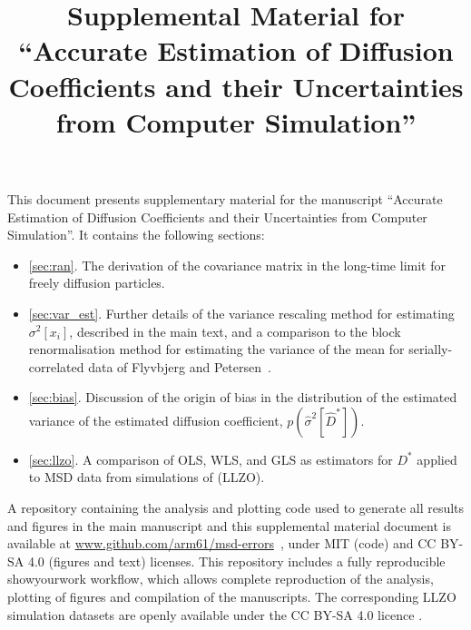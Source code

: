 \documentclass[reprint,superscriptaddress,nobibnotes,amsmath,amssymb,aps,prx,hidelinks]{revtex4-2}
\makeatletter
\newcommand{\papertitle}{Accurate Estimation of Diffusion Coefficients and their Uncertainties from Computer Simulation}
\newcommand{\oMSDi}{\ensuremath{x_i}}
\newcommand{\prob}[1]{\ensuremath{p(#1)}}
\newcommand{\code}[1]{#1}
\newcommand{\Dest}{\ensuremath{\widehat{D}^*}}
\newcommand{\D}{\ensuremath{D^*}}
\newcommand{\var}[1]{\ensuremath{\sigma^2[#1]}}
\newcommand{\varest}[1]{\ensuremath{\widehat{\sigma}^2[#1]}}
\def\maketitle{
\@author@finish
\title@column\titleblock@produce
\suppressfloats[t]}
\makeatother
\begin{document}



\let\addcontentsline\oldaddcontentsline

 \onecolumngrid
 \clearpage 
 \twocolumngrid

 \appendix
 \renewcommand\thesection{S-\Roman{section}}
 \renewcommand\thefigure{S-\arabic{figure}}
 \setcounter{figure}{0}
 \renewcommand\theequation{S-\arabic{equation}}
 \setcounter{equation}{0}
 \renewcommand\thetable{S-\arabic{table}}
 \setcounter{table}{0}
 \renewcommand\thepage{S-\arabic{page}}

 \title{Supplemental Material for ``\papertitle''}
 \maketitle
 This document presents supplementary material for the manuscript ``\papertitle''.
It contains the following sections:
\renewcommand{\labelitemi}{}
\begin{itemize}
    \item \ref{sec:ran}. The derivation of the covariance matrix in the long-time limit for freely diffusion particles.
    \item \ref{sec:var_est}. Further details of the variance rescaling method for estimating $\var{\oMSDi}$, described in the main text, and a comparison to the block renormalisation method for estimating the variance of the mean for serially-correlated data of Flyvbjerg and Petersen~\cite{FlyvbjergAndPetersen_JChemPhys1989}.
    \item \ref{sec:bias}. Discussion of the origin of bias in the distribution of the estimated variance of the estimated diffusion coefficient, $\prob{\varest{\Dest}}$.
    \item \ref{sec:llzo}. A comparison of OLS, WLS, and GLS as estimators for $\D$ applied to MSD data from simulations of  (LLZO).
\end{itemize}
A repository containing the analysis and plotting code used to generate all results and figures in the main manuscript and this supplemental material document is available at \url{www.github.com/arm61/msd-errors}~\cite{mccluskey_github_2022}, under MIT (code) and CC BY-SA 4.0 (figures and text) licenses.
This repository includes a fully reproducible \code{showyourwork} workflow, which allows complete reproduction of the analysis, plotting of figures and compilation of the manuscript{}s.
The corresponding LLZO simulation datasets are openly available under the CC BY-SA 4.0 licence \cite{coles_llzo_zenodo_2022}. 
\end{document}
